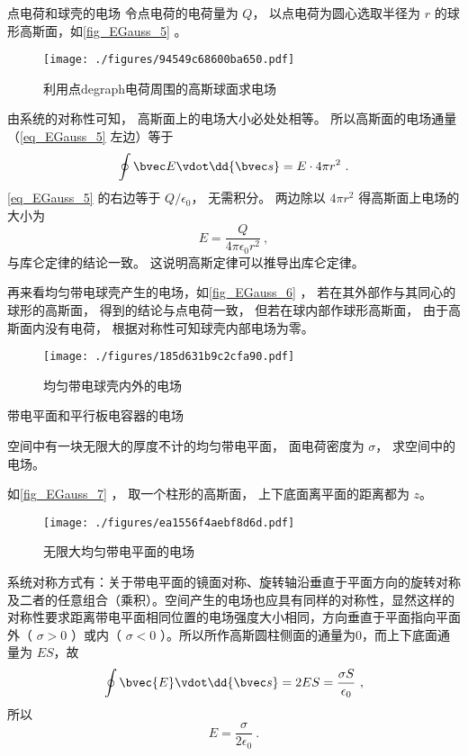 \begin{example}{点电荷和球壳的电场}\label{ex_EGauss_10}
令点电荷的电荷量为 $Q$， 以点电荷为圆心选取半径为 $r$ 的球形高斯面，如\autoref{fig_EGauss_5} 。 
\begin{figure}[ht]
\centering
\texttt{[image: ./figures/94549c68600ba650.pdf]}
\caption{利用点degraph电荷周围的高斯球面求电场} \label{fig_EGauss_5}
\end{figure}
由系统的对称性可知， 高斯面上的电场大小必处处相等。 所以高斯面的电场通量（\autoref{eq_EGauss_5} 左边）等于
\begin{equation}
\oint \bvec E \vdot \dd{\bvec s} = E \cdot 4\pi r^2~.
\end{equation}
\autoref{eq_EGauss_5} 的右边等于 $Q/\epsilon_0$， 无需积分。 两边除以 $4\pi r^2$ 得高斯面上电场的大小为
\begin{equation}
E = \frac{Q}{4\pi\epsilon_0 r^2}~,
\end{equation}
与库仑定律的结论一致。 这说明高斯定律可以推导出库仑定律。

再来看均匀带电球壳产生的电场，如\autoref{fig_EGauss_6} ， 若在其外部作与其同心的球形的高斯面， 得到的结论与点电荷一致， 但若在球内部作球形高斯面， 由于高斯面内没有电荷， 根据对称性可知球壳内部电场为零。
\begin{figure}[ht]
\centering
\texttt{[image: ./figures/185d631b9c2cfa90.pdf]}
\caption{均匀带电球壳内外的电场} \label{fig_EGauss_6}
\end{figure}
\end{example}


\begin{example}{带电平面和平行板电容器的电场}

空间中有一块无限大的厚度不计的均匀带电平面， 面电荷密度为 $\sigma$， 求空间中的电场。

如\autoref{fig_EGauss_7} ， 取一个柱形的高斯面， 上下底面离平面的距离都为 $z$。
\begin{figure}[ht]
\centering
\texttt{[image: ./figures/ea1556f4aebf8d6d.pdf]}
\caption{无限大均匀带电平面的电场} \label{fig_EGauss_7}
\end{figure}
系统对称方式有：关于带电平面的镜面对称、旋转轴沿垂直于平面方向的旋转对称及二者的任意组合（乘积）。空间产生的电场也应具有同样的对称性，显然这样的对称性要求距离带电平面相同位置的电场强度大小相同，方向垂直于平面指向平面外（ $\sigma>0$ ）或内（ $\sigma<0$ ）。所以所作高斯圆柱侧面的通量为0，而上下底面通量为 $ES$，故
\begin{equation}
\oint \bvec{E}\vdot \dd{\bvec s}=2ES=\frac{\sigma S}{\epsilon_0}~,
\end{equation}
所以
\begin{equation}
E=\frac{\sigma}{2\epsilon_0}~.
\end{equation}

\end{example}

